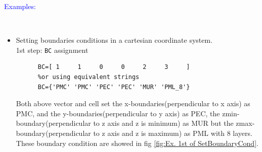 	\textcolor{blue}{\begin{large}Examples:\end{large}}\\
\begin{itemize}
 \item    Setting boundaries conditions in a cartesian coordinate system.\\
       1st step: \texttt{BC} assignment
    \begin{myindentpar}
	  \begin{lstlisting}[caption={BC assignment as fig \ref{fig:Ex. 1st of SetBoundaryCond} },label={listing:1st SettingofBC}]
	  %using numbers 
	  BC=[ 1     1     0     0     2     3     ] 
	  %or using equivalent strings
	  BC={'PMC' 'PMC' 'PEC' 'PEC' 'MUR' 'PML_8'} 
		      \end{lstlisting}
	  Both above vector and cell set  the x-boundaries(perpendicular to x axis) as PMC, and the y-boundaries(perpendicular to y axis) as PEC, the zmin-boundary(perpendicular to z axis and z is minimum) as MUR but the zmax-boundary(perpendicular to z axis and z is maximum) as PML with 8 layers. These boundary condition are showed in fig \ref{fig:Ex. 1st of SetBoundaryCond}.
	      \begin{figure}[ht]
		      \centering
		    \qquad
		    \qquad 

\end{figure}
\end{myindentpar}
\end{itemize}
